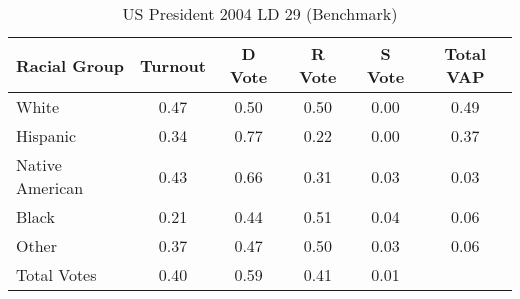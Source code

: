 \begin{table}[htb]
\begin{center}
\caption{US President 2004 LD 29 (Benchmark)}
\label{pres04_vap_ld_29_benchmark}
\begin{tabular}{lccccc}
  \hline
Racial Group & Turnout & D Vote & R Vote & S Vote & Total VAP \\ 
  \hline
White & 0.47 & 0.50 & 0.50 & 0.00 & 0.49 \\ 
  Hispanic & 0.34 & 0.77 & 0.22 & 0.00 & 0.37 \\ 
  Native American & 0.43 & 0.66 & 0.31 & 0.03 & 0.03 \\ 
  Black & 0.21 & 0.44 & 0.51 & 0.04 & 0.06 \\ 
  Other & 0.37 & 0.47 & 0.50 & 0.03 & 0.06 \\ 
  Total Votes & 0.40 & 0.59 & 0.41 & 0.01 &  \\ 
   \hline
\end{tabular}
\end{center}
\end{table}
